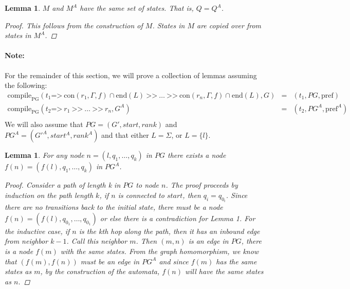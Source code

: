 \documentclass[twocolumn, openany]{sig-alternate-10pt}
\newcommand{\para}[1]{\paragraph*{\textbf{#1}}}
\newcommand{\Prefer}{\texttt{>>}}
\newcommand{\Path}{\texttt{=>}}
\newcommand{\Con}{\mathrm{con}}
\newcommand{\CompilePg}{\ensuremath{\mathrm{compile}_\mathrm{PG}}}
\newcommand{\Pref}{\ensuremath{\mathrm{pref}}}
\newcommand{\EndR}{\ensuremath{\mathrm{end}}}
\newtheorem{lem}[thm]{Lemma}
\begin{document}
\vspace{.5em}
\begin{lem} $M$ and $M^A$ have the same set of states. That is, $Q = Q^A$.
    $ $
    \vspace{1em}
    \begin{proof}
      This follows from the construction of $M$. States in $M$ are copied over from states in $M^A$.
    \end{proof}
\end{lem}

\vspace{1em}
\para{Note:}
For the remainder of this section, we will prove a collection of lemmas assuming the following: 
%
\[
\begin{array}{lll}
  \CompilePg(t_1 \Path~ \Con(r_1,\Gamma,f) \cap \EndR(L) ~\Prefer~ \ldots ~\Prefer~ \Con(r_n,\Gamma,f) \cap \EndR(L), G) &=& (t_1, PG, \Pref) \\
  \CompilePg(t_2 \Path~ r_1 ~\Prefer~ \ldots ~\Prefer~ r_n, G^A) &=& (t_2, PG^A, \Pref^A) \\
\end{array}
\]
%
We will also assume that $PG = (G',start,rank)$ and $PG^A = (G'^A,start^A,rank^A)$ and that either $L = \Sigma$, or $L = \{ l \}$.
\vspace{2em}

\begin{lem}
  For any node $n = (l,q_1,\ldots,q_k)$ in $PG$ there exists a node $f(n) = (f(l),q_1,\ldots,q_k)$ in $PG^A$.
  \begin{proof}
    Consider a path of length k in $PG$ to node $n$. The proof proceeds by induction on the path length $k$, if $n$ is connected to $start$, then $q_i = q_{0_i}$. Since there are no transitions back to the initial state, there must be a node $f(n) = (f(l), q_{0_1}, \ldots, q_{0_1})$ or else there is a contradiction for Lemma 1. For the inductive case, if $n$ is the kth hop along the path, then it has an inbound edge from neighbor $k-1$. Call this neighbor $m$. Then $(m,n)$ is an edge in $PG$, there is a node $f(m)$ with the same states. From the graph homomorphism, we know that $(f(m),f(n))$ must be an edge in $PG^A$ and since $f(m)$ has the same states as $m$, by the construction of the automata, $f(n)$ will have the same states as $n$.
  \end{proof}
\end{lem}
\end{document}

